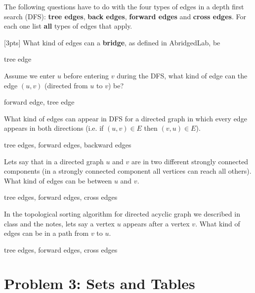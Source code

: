 \begin{cluster}
\label{grp:prb:examii-practice::dfs-edges}

\begin{problem}
\label{prb:examii-practice::dfs-edges}
The following questions have to do with the four types of edges in
a depth first search (DFS): \textbf{tree edges}, \textbf{back edges},
\textbf{forward edges} and \textbf{cross edges}.  For each one list
\textbf{all} types of edges that apply.

\ask \label{prt-ask:examii-practice::3pts}
[3pts]
What kind of edges can a \textbf{bridge}, as defined in AbridgedLab, be

\sol \label{cki-sol:examii-practice::tree}

tree edge

\ask[3pts]
Assume we enter $u$ before entering $v$ during the DFS, what kind of
edge can the edge $(u,v)$ (directed from $u$ to $v$) be?

\sol \label{cki-sol:examii-practice::forward}

forward edge, tree edge


\ask[3pts]
What kind of edges can appear in DFS for a directed graph in which
every edge appears in both directions (i.e. if $(u,v) \in E$ then $(v,u)
\in E$).

\sol \label{cki-sol:examii-practice::edges}

tree edges, forward edges, backward edges


\ask[3pts] Lets say that in a directed graph $u$ and $v$ are in two
different strongly connected components (in a strongly connected
component all vertices can reach all others).  What kind of edges can
be between $u$ and $v$.

\sol \label{cki-sol:examii-practice::cross}

tree edges, forward edges, cross edges

\ask[3pts]
In the topological sorting algorithm for directed acyclic graph we
described in class and the notes, lets say a vertex $u$ appears
after a vertex $v$.  What kind of edges can be in a path
from $v$ to $u$.

\sol \label{cki-sol:examii-practice::_2_}

tree edges, forward edges, cross edges


\end{problem}
\end{cluster}


\section{Problem 3: Sets and Tables}
\label{sec:examii-practice::problem-3-sets-and-tables}


